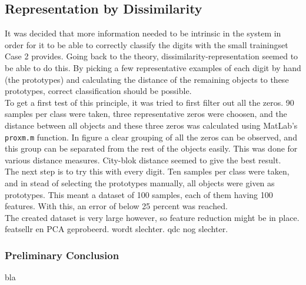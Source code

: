 \subsection{Representation by Dissimilarity}
It was decided that more information needed to be intrinsic in the system in order for it to be able to correctly classify the digits with the small trainingset Case 2 provides. Going back to the theory, dissimilarity-representation seemed to be able to do this. By picking a few representative examples of each digit by hand (the prototypes) and calculating the distance of the remaining objects to these prototypes, correct classification should be possible. \\
\noindent To get a first test of this principle, it was tried to first filter out all the zeros. 90 samples per class were taken, three representative zeros were choosen, and the distance between all objects and these three zeros was calculated using MatLab's \texttt{proxm.m} function. In figure  a clear grouping of all the zeros can be observed, and this group can be separated from the rest of the objects easily. This was done for various distance measures. City-blok distance seemed to give the best result.  \\
\noindent The next step is to try this with every digit. Ten samples per class were taken, and in stead of selecting the prototypes manually, all objects were given as prototypes. This meant a dataset of 100 samples, each of them having 100 features. With this, an error of below 25 percent was reached.  \\
\noindent The created dataset is very large however, so feature reduction might be in place. 
featsellr en PCA geprobeerd. wordt slechter. qdc nog slechter. 

\subsubsection*{Preliminary Conclusion}
bla

